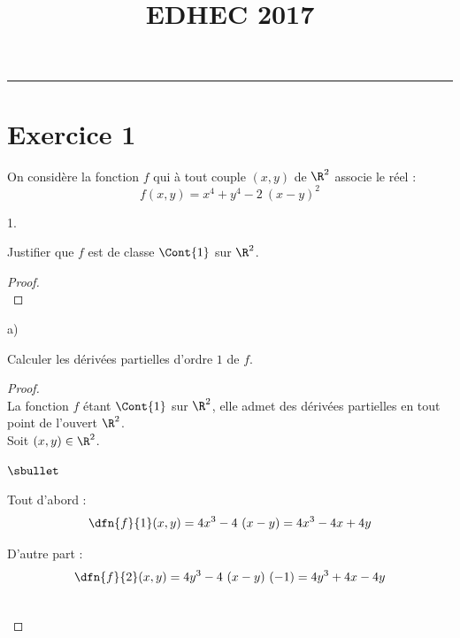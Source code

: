 \documentclass[11pt]{article}%
\title{\bf \vspace{-2cm} EDHEC 2017} %
\author{} %
\date{} %
\begin{document}
\maketitle %
\vspace{-1.4cm}\hrule %
\thispagestyle{fancy}

\vspace*{.2cm}


\section*{Exercice 1}

\noindent
On considère la fonction $f$ qui à tout couple $(x,y)$ de $\R^{2}$
associe le réel :
\[
f(x,y) = x^{4} + y^{4} - 2 \ (x-y)^{2}
\]
\begin{noliste}{1.}
  \setlength{\itemsep}{4mm}
\item Justifier que $f$ est de classe $\Cont{1}$ sur $\R^{2}$.

  \begin{proof}~%
    ~\\[-.8cm] 
  \end{proof}

\item
  \begin{noliste}{a)}
    \setlength{\itemsep}{2mm}
  \item Calculer les dérivées partielles d'ordre $1$ de $f$.

    \begin{proof}~\\%
      La fonction $f$ étant $\Cont{1}$ sur $\R^2$, elle admet des
      dérivées partielles en tout point de l'ouvert $\R^2$.\\
      Soit $(x, y) \in \R^2$.
      \begin{noliste}{$\sbullet$}
      \item Tout d'abord :
        \[
        \dfn{f}{1}(x, y) = 4 x^3 - 4 \ (x-y) = 4 x^3 - 4 x + 4y
        \]
      \item D'autre part :
        \[
        \dfn{f}{2}(x, y) = 4 y^3 - 4 \ (x-y) \ (-1) = 4 y^3 + 4 x - 4y
        \]
      \end{noliste}
      ~\\[-1cm]
    \end{proof}


\end{noliste}
\end{noliste}
\end{document}
